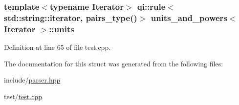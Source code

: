 \subsubsection[{\texorpdfstring{units}{units}}]{\setlength{\rightskip}{0pt plus 5cm}template$<$typename Iterator$>$ qi\+::rule$<$std\+::string\+::iterator, {\bf pairs\+\_\+type}()$>$ {\bf units\+\_\+and\+\_\+powers}$<$ Iterator $>$\+::units}\hypertarget{structunits__and__powers_ad6ac559c4efd891700a991703319db57}{}\label{structunits__and__powers_ad6ac559c4efd891700a991703319db57}


Definition at line 65 of file test.\+cpp.



The documentation for this struct was generated from the following files\+:\begin{DoxyCompactItemize}
\item 
include/\hyperlink{parser_8hpp}{parser.\+hpp}\item 
test/\hyperlink{test_8cpp}{test.\+cpp}\end{DoxyCompactItemize}
